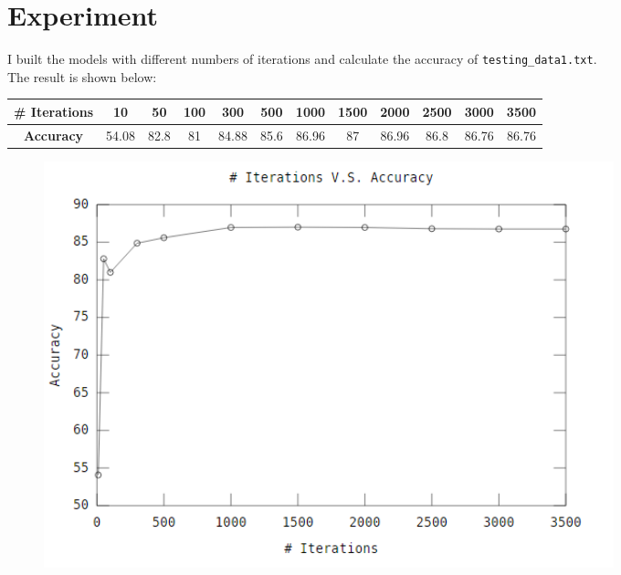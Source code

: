 \documentclass[12pt]{article}
\begin{document}
\section{Experiment}
    I built the models with different numbers of iterations and calculate the accuracy of \verb|testing_data1.txt|.\\
    The result is shown below:\\
    \begin{table}[h!]
        \centering
        \label{tbl:accuracy}
        \begin{tabular}{|c|c|c|c|c|c|c|c|c|c|c|c|}
        \hline
        \textbf{\# Iterations} & 10    & 50   & 100 & 300   & 500  & 1000  & 1500 & 2000  & 2500 & 3000  & 3500  \\ \hline
        \textbf{Accuracy}      & 54.08 & 82.8 & 81  & 84.88 & 85.6 & 86.96 & 87   & 86.96 & 86.8 & 86.76 & 86.76 \\ \hline
        \end{tabular}
    \end{table}
    \begin{figure}[H]
        \centering
        \includegraphics[width=0.8\textwidth]{fig}
        \label{fig:accuracy}
    \end{figure}

 
\end{document}
